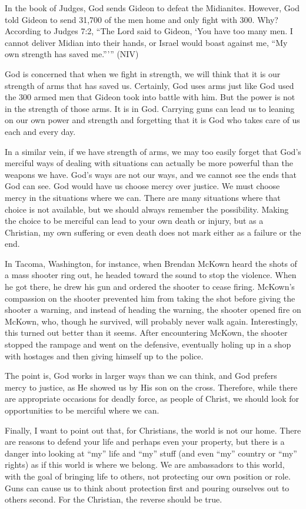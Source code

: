 In the book of Judges, God sends Gideon to defeat the Midianites.
However, God told Gideon to send 31,700 of the men home and only fight
with 300. Why?  According to Judges 7:2, “The Lord said to Gideon, ‘You
have too many men. I cannot deliver Midian into their hands, or Israel
would boast against me, “My own strength has saved me.”’” (NIV)

God is concerned that when we fight in strength, we will think that it
is our strength of arms that has saved us. Certainly, God uses arms
just like God used the 300 armed men that Gideon took into battle with
him. But the power is not in the strength of those arms. It is in God.
Carrying guns can lead us to leaning on our own power and strength and
forgetting that it is God who takes care of us each and every day.

In a similar vein, if we have strength of arms, we may too easily forget
that God’s merciful ways of dealing with situations can actually be
more powerful than the weapons we have. God’s ways are not our ways,
and we cannot see the ends that God can see. God would have us choose
mercy over justice. We must choose mercy in the situations where we
can. There are many situations where that choice is not available, but
we should always remember the possibility. Making the choice to be
merciful can lead to your own death or injury, but as a Christian, my
own suffering or even death does not mark either as a failure or the
end. 

In Tacoma, Washington, for instance, when Brendan McKown heard the shots
of a mass shooter ring out, he headed toward the sound to stop the
violence.  When he got there, he drew his gun and ordered the shooter
to cease firing. McKown’s compassion on the shooter prevented him from
taking the shot before giving the shooter a warning, and instead of
heading the warning, the shooter opened fire on McKown, who, though he
survived, will probably never walk again. Interestingly, this turned
out better than it seems. After encountering McKown, the shooter
stopped the rampage and went on the defensive, eventually holing up in
a shop with hostages and then giving himself up to the police.  

The point is, God works in larger ways than we can think, and God
prefers mercy to justice, as He showed us by His son on the cross.
Therefore, while there are appropriate occasions for deadly force, as
people of Christ, we should look for opportunities to be merciful where
we can.

Finally, I want to point out that, for Christians, the world is not our
home. There are reasons to defend your life and perhaps even your
property, but there is a danger into looking at ``my'' life and ``my''
stuff (and even ``my'' country or ``my'' rights) as if this world is where
we belong. We are ambassadors to this world, with the goal of bringing
life to others, not protecting our own position or role. Guns can cause
us to think about protection first and pouring ourselves out to others
second. For the Christian, the reverse should be true.


